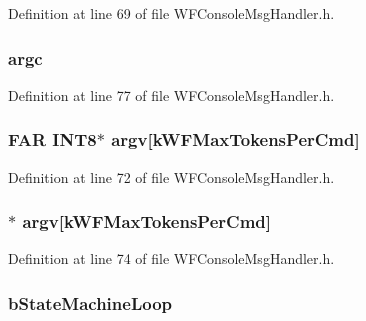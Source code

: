 Definition at line 69 of file W\+F\+Console\+Msg\+Handler.\+h.

\hypertarget{structt_console_context_a87ea22d9a6af781abe0e449b1814ed92}{}
\subsubsection[{argc}]{ argc}\label{structt_console_context_a87ea22d9a6af781abe0e449b1814ed92}


Definition at line 77 of file W\+F\+Console\+Msg\+Handler.\+h.

\hypertarget{structt_console_context_a05ba4f6092dd3b82ef2ff4ce631434c1}{}
\subsubsection[{argv}]{\setlength{\rightskip}{0pt plus 5cm}F\+A\+R {\bf I\+N\+T8}$\ast$ argv\mbox{[}k\+W\+F\+Max\+Tokens\+Per\+Cmd\mbox{]}}\label{structt_console_context_a05ba4f6092dd3b82ef2ff4ce631434c1}


Definition at line 72 of file W\+F\+Console\+Msg\+Handler.\+h.

\hypertarget{structt_console_context_ab20db0748e70ff77777cde949c76bb39}{}
\subsubsection[{argv}]{$\ast$ argv\mbox{[}k\+W\+F\+Max\+Tokens\+Per\+Cmd\mbox{]}}\label{structt_console_context_ab20db0748e70ff77777cde949c76bb39}


Definition at line 74 of file W\+F\+Console\+Msg\+Handler.\+h.

\hypertarget{structt_console_context_aa26da1cf710ba0e468ef70bdaaf04fab}{}
\subsubsection[{b\+State\+Machine\+Loop}]{ b\+State\+Machine\+Loop}\label{structt_console_context_aa26da1cf710ba0e468ef70bdaaf04fab}


